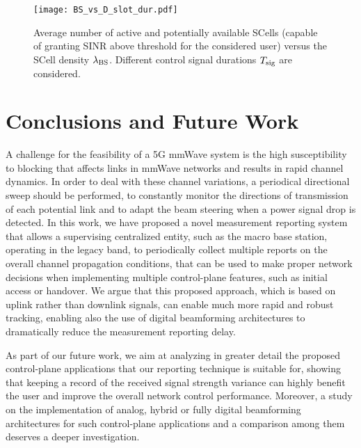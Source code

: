 \documentclass[conference,a4paper]{IEEEtran}
\begin{document}
\begin{figure}[t!]
\centering
 \texttt{[image: BS\_vs\_D\_slot\_dur.pdf]}
 \caption{Average number of active and potentially available SCells (capable of granting SINR above threshold for the considered user) versus the SCell density $\lambda_{\rm BS}$. Different control signal durations $T_{\rm sig}$ are considered.}
 \label{fig:BS_vs_D}
\end{figure}



\section{Conclusions and Future Work}
\label{conclu}

A  challenge for the feasibility of a 5G mmWave system is the high susceptibility to blocking that affects links in mmWave networks and results in rapid channel dynamics.
In order to deal with these channel variations, a periodical directional sweep should be performed, to constantly monitor the directions of transmission of each potential link and to adapt the beam steering when a power signal drop is detected.
In this work, we have proposed a novel measurement reporting system that allows a supervising centralized entity, such as the macro base station, operating in the legacy band, to periodically collect multiple reports on the overall channel propagation conditions, that can be used to make proper network decisions when implementing multiple control-plane features, such as initial access or handover.
We argue that this proposed approach, which is based on uplink rather than downlink signals, can enable much more rapid and robust tracking, enabling also the use of digital beamforming architectures to dramatically reduce the measurement reporting delay.

As part of our future work, we aim at analyzing in greater detail the proposed control-plane applications that our reporting technique is suitable for, showing that keeping a record of the received signal strength variance can highly benefit the user and improve the overall network control performance. Moreover, a study on the implementation of analog, hybrid or fully digital beamforming architectures for such control-plane applications and a comparison among them deserves a deeper investigation.







\end{document}
